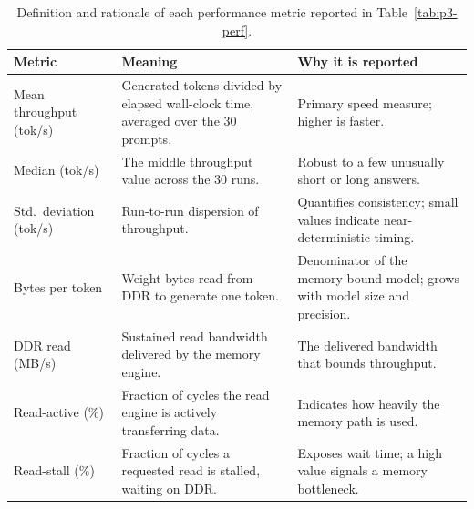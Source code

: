 \begin{table}[H]
\centering
\caption{Definition and rationale of each performance metric reported in Table~\ref{tab:p3-perf}.}
\label{tab:p3-metrics}
\renewcommand{\arraystretch}{1.3}
\begin{tabular}{@{}>{\raggedright\arraybackslash}p{} >{\raggedright\arraybackslash}p{} >{\raggedright\arraybackslash}p{}@{}}
\toprule
\textbf{Metric} & \textbf{Meaning} & \textbf{Why it is reported} \\
\midrule
Mean throughput (tok/s) & Generated tokens divided by elapsed wall-clock time, averaged over the 30 prompts. & Primary speed measure; higher is faster. \\
Median (tok/s) & The middle throughput value across the 30 runs. & Robust to a few unusually short or long answers. \\
Std.\ deviation (tok/s) & Run-to-run dispersion of throughput. & Quantifies consistency; small values indicate near-deterministic timing. \\
Bytes per token & Weight bytes read from DDR to generate one token. & Denominator of the memory-bound model; grows with model size and precision. \\
DDR read (MB/s) & Sustained read bandwidth delivered by the memory engine. & The delivered bandwidth that bounds throughput. \\
Read-active (\%) & Fraction of cycles the read engine is actively transferring data. & Indicates how heavily the memory path is used. \\
Read-stall (\%) & Fraction of cycles a requested read is stalled, waiting on DDR. & Exposes wait time; a high value signals a memory bottleneck. \\
\bottomrule
\end{tabular}
\end{table}

